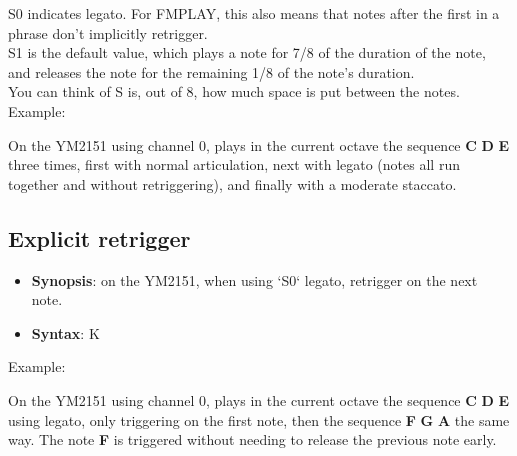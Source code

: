 \vspace{16pt}

{\ttfamily S0} indicates legato. For FMPLAY, this also means that notes after
the first in a phrase don't implicitly retrigger.\\

{\ttfamily S1} is the default value, which plays a note for 7/8 of the duration
of the note, and releases the note for the remaining 1/8 of the note's
duration.\\

You can think of {\ttfamily S} is, out of 8, how much space is put between the
notes.\\

Example:\\


On the YM2151 using channel 0, plays in the current octave the sequence
{\ttfamily\bfseries C} {\ttfamily\bfseries D} {\ttfamily\bfseries E} three
times, first with normal articulation, next with legato (notes all run together
and without retriggering), and finally with a moderate staccato.\\

\subsection{Explicit retrigger}

\begin{itemize}

	\item {\bfseries Synopsis}: on the YM2151, when using `S0` legato, retrigger on the next note.

	\item {\bfseries Syntax}: {\ttfamily K}

\end{itemize}

\vspace{16pt}

Example:\\


On the YM2151 using channel 0, plays in the current octave the sequence
{\ttfamily\bfseries C} {\ttfamily\bfseries D} {\ttfamily\bfseries E} using
legato, only triggering on the first note, then the sequence
{\ttfamily\bfseries F} {\ttfamily\bfseries G} {\ttfamily\bfseries A} the same
way. The note {\ttfamily\bfseries F} is triggered without needing to release
the previous note early.\\

